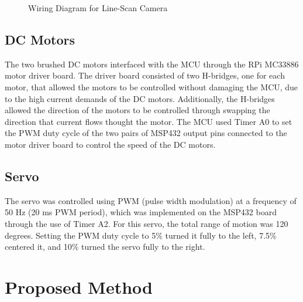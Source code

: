 \documentclass{article}
\begin{document}
\begin{figure}[htbp]
  \centering
  \caption[Short caption]{Wiring Diagram for Line-Scan Camera \cite{labManual} \fontsize{8pt}{10pt}\selectfont}
  \label{fig-cameraWiring}
\end{figure}

\subsection{DC Motors}
The two brushed DC motors interfaced with the MCU through the RPi MC33886 motor driver board. The driver board consisted of two H-bridges, one for each motor, that allowed the motors to be controlled without damaging the MCU, due to the high current demands of the DC motors. Additionally, the H-bridges allowed the direction of the motors to be controlled through swapping the direction that current flows thought the motor. 
The MCU used Timer A0 to set the PWM duty cycle of the two pairs of MSP432 output pins connected to the motor driver board to control the speed of the DC motors.  

\subsection{Servo}
The servo was controlled using PWM (pulse width modulation) at a frequency of 50 Hz (20 ms PWM period), which was implemented on the MSP432 board through the use of Timer A2. For this servo, the total range of motion was 120 degrees. Setting the PWM duty cycle to 5\% turned it fully to the left, 7.5\% centered it, and 10\% turned the servo fully to the right.

\section{Proposed Method}
\label{sec:method}
\end{document}
